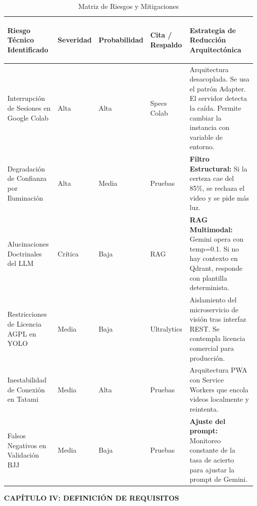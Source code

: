 \documentclass[12pt,letterpaper]{article}
\begin{document}
\begin{table}[htbp]
\centering
\footnotesize
\begin{tabularx}{\textwidth}{|>{\bfseries\raggedright\arraybackslash}p{}|l|l|>{\raggedright\arraybackslash}p{}|>{\raggedright\arraybackslash}X|}
    \hline
    Riesgo Técnico Identificado & Severidad & Probabilidad & Cita / Respaldo & Estrategia de Reducción Arquitectónica \\ \hline
    Interrupción de Sesiones en Google Colab & Alta & Alta & Specs Colab & Arquitectura desacoplada. Se usa el patrón Adapter. El servidor detecta la caída. Permite cambiar la instancia con variable de entorno. \\ \hline
    Degradación de Confianza por Iluminación & Alta & Media & Pruebas & \textbf{Filtro Estructural:} Si la certeza cae del 85\%, se rechaza el video y se pide más luz. \\ \hline
    Alucinaciones Doctrinales del LLM & Crítica & Baja & RAG & \textbf{RAG Multimodal:} Gemini opera con temp=0.1. Si no hay contexto en Qdrant, responde con plantilla determinista. \\ \hline
    Restricciones de Licencia AGPL en YOLO & Media & Baja & Ultralytics & Aislamiento del microservicio de visión tras interfaz REST. Se contempla licencia comercial para producción. \\ \hline
    Inestabilidad de Conexión en Tatami & Media & Alta & Pruebas & Arquitectura PWA con Service Workers que encola videos localmente y reintenta. \\ \hline
    Falsos Negativos en Validación BJJ & Media & Baja & Pruebas & \textbf{Ajuste del prompt:} Monitoreo constante de la tasa de acierto para ajustar la prompt de Gemini. \\ \hline
\end{tabularx}
\caption{Matriz de Riesgos y Mitigaciones}
\label{tab:riesgos}
\end{table}

\clearpage

\renewcommand{\thesection}{4.\arabic{section}}
\renewcommand{\thesubsection}{4.\arabic{section}.\arabic{subsection}}
\setcounter{section}{0}

\begin{center}
    {\bfseries\Large CAPÍTULO IV: DEFINICIÓN DE REQUISITOS \par}
\end{center}
\vspace{1cm}
\end{document}
